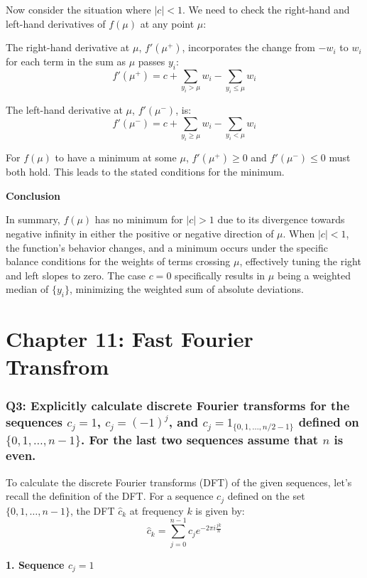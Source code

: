 \documentclass[8pt]{article}
\begin{document}
Now consider the situation where \( |c| < 1 \). We need to check the right-hand and left-hand derivatives of \( f(\mu) \) at any point \( \mu \):

The right-hand derivative at \( \mu \), \( f'(\mu^+) \), incorporates the change from \( -w_i \) to \( w_i \) for each term in the sum as \( \mu \) passes \( y_i \):
\[
f'(\mu^+) = c + \sum_{y_i > \mu} w_i - \sum_{y_i \leq \mu} w_i
\]

The left-hand derivative at \( \mu \), \( f'(\mu^-) \), is:
\[
f'(\mu^-) = c + \sum_{y_i \geq \mu} w_i - \sum_{y_i < \mu} w_i
\]

For \( f(\mu) \) to have a minimum at some \( \mu \), \( f'(\mu^+) \geq 0 \) and \( f'(\mu^-) \leq 0 \) must both hold. This leads to the stated conditions for the minimum.

\textbf{Conclusion}

In summary, \( f(\mu) \) has no minimum for \( |c| > 1 \) due to its divergence towards negative infinity in either the positive or negative direction of \( \mu \). When \( |c| < 1 \), the function's behavior changes, and a minimum occurs under the specific balance conditions for the weights of terms crossing \( \mu \), effectively tuning the right and left slopes to zero. The case \( c = 0 \) specifically results in \( \mu \) being a weighted median of \( \{y_i\} \), minimizing the weighted sum of absolute deviations.

\newpage
\section*{Chapter 11: Fast Fourier Transfrom}

\subsubsection*{Q3:
Explicitly calculate discrete Fourier transforms for the sequences \( c_j = 1 \), \( c_j = (-1)^j \), and \( c_j = 1_{\{0,1,\ldots,n/2-1\}} \) defined on \(\{0, 1, \ldots, n-1\}\). For the last two sequences assume that \(n\) is even.}

To calculate the discrete Fourier transforms (DFT) of the given sequences, let's recall the definition of the DFT. For a sequence \( c_j \) defined on the set \( \{0, 1, \ldots, n-1\} \), the DFT \( \hat{c}_k \) at frequency \( k \) is given by:
\[
\hat{c}_k = \sum_{j=0}^{n-1} c_j e^{-2\pi i \frac{jk}{n}}
\]

\textbf{1. Sequence \( c_j = 1 \)}
\end{document}
